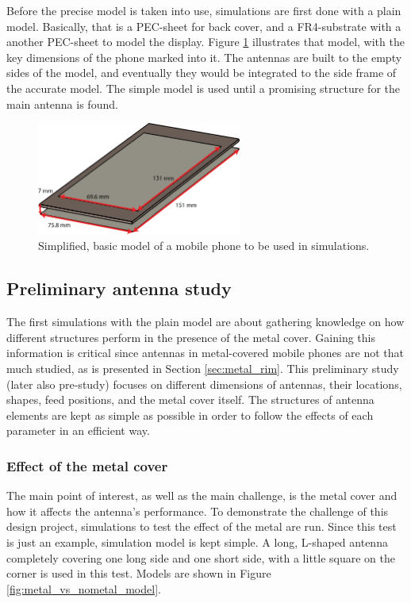 Before the precise model is taken into use, simulations are first done with a plain model. Basically, that is a PEC-sheet for back cover, and a FR4-substrate with a another PEC-sheet to model the display. Figure \ref{fig:basic_structure} illustrates that model, with the key dimensions of the phone marked into it. The antennas are built to the empty sides of the model, and eventually they would be integrated to the side frame of the accurate model. The simple model is used until a promising structure for the main antenna is found. 
\begin{figure}[H]
    \centering
    \includegraphics[width=0.6\textwidth]{img/basic_structure.eps}
    \caption{Simplified, basic model of a mobile phone to be used in simulations.}
    \label{fig:basic_structure}
\end{figure}

\subsection{Preliminary antenna study}
\label{sec:pre_study}
The first simulations with the plain model are about gathering knowledge on how different structures perform in the presence of the metal cover. Gaining this information is critical since antennas in metal-covered mobile phones are not that much studied, as is presented in Section \ref{sec:metal_rim}. This preliminary study (later also pre-study) focuses on different dimensions of antennas, their locations, shapes, feed positions, and the metal cover itself. The structures of antenna elements are kept as simple as possible in order to follow the effects of each parameter in an efficient way. 


\subsubsection{Effect of the metal cover}
\label{sec:metal_effect}
The main point of interest, as well as the main challenge, is the metal cover and how it affects the antenna's performance. To demonstrate the challenge of this design project, simulations to test the effect of the metal are run. Since this test is just an example, simulation model is kept simple. A long, L-shaped antenna completely covering one long side and one short side, with a little square on the corner is used in this test. Models are shown in Figure \ref{fig:metal_vs_nometal_model}.

